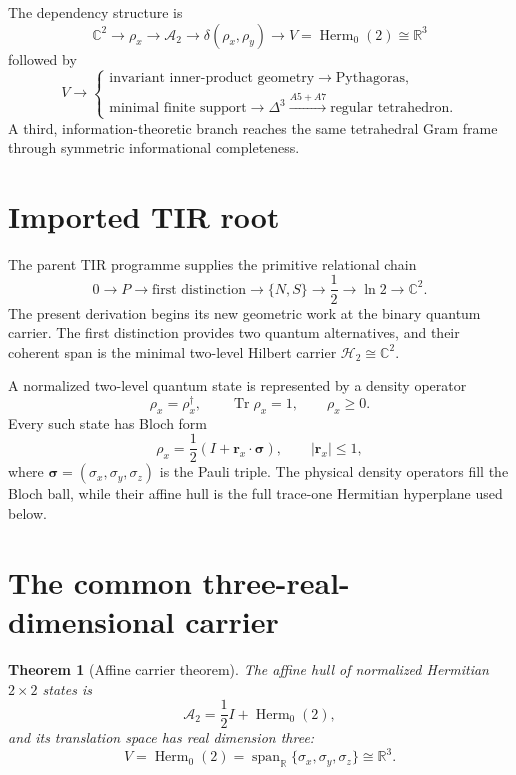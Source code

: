 \documentclass[12pt,a4paper]{article}
\newtheorem{theorem}{Theorem}[section]
\newcommand{\Herm}{\operatorname{Herm}}
\newcommand{\Tr}{\operatorname{Tr}}
\newcommand{\R}{\mathbb{R}}
\newcommand{\C}{\mathbb{C}}
\newcommand{\Astate}{\mathcal{A}_2}
\newcommand{\sigmavec}{\bm{\sigma}}
\newcommand{\rvec}{\bm{r}}
\begin{document}
The dependency structure is
\[
\boxed{
\C^2
\longrightarrow
\rho_x
\longrightarrow
\Astate
\longrightarrow
\delta(\rho_x,\rho_y)
\longrightarrow
V=\Herm_0(2)\cong\R^3
}
\]
followed by
\[
\boxed{
V\longrightarrow
\begin{cases}
\text{invariant inner-product geometry}\longrightarrow\text{Pythagoras},\\[2mm]
\text{minimal finite support}\longrightarrow\Delta^3\xrightarrow{A5+A7}\text{regular tetrahedron}.
\end{cases}}
\]
A third, information-theoretic branch reaches the same tetrahedral Gram frame through symmetric informational completeness.

\section{Imported TIR root}

The parent TIR programme supplies the primitive relational chain
\[
0\longrightarrow P\longrightarrow\text{first distinction}\longrightarrow\{N,S\}
\longrightarrow\frac12\longrightarrow\ln 2\longrightarrow\C^2.
\]
The present derivation begins its new geometric work at the binary quantum carrier. The first distinction provides two quantum alternatives, and their coherent span is the minimal two-level Hilbert carrier $\mathcal H_2\cong\C^2$.

A normalized two-level quantum state is represented by a density operator
\[
\rho_x=\rho_x^\dagger,\qquad \Tr\rho_x=1,\qquad \rho_x\ge 0.
\]
Every such state has Bloch form \cite{NielsenChuang}
\[
\boxed{
\rho_x=\frac12\left(I+\rvec_x\cdot\sigmavec\right),\qquad |\rvec_x|\le 1,
}
\]
where $\sigmavec=(\sigma_x,\sigma_y,\sigma_z)$ is the Pauli triple. The physical density operators fill the Bloch ball, while their affine hull is the full trace-one Hermitian hyperplane used below.

\section{The common three-real-dimensional carrier}

\begin{theorem}[Affine carrier theorem]\label{thm:carrier}
The affine hull of normalized Hermitian $2\times2$ states is
\[
\Astate=\frac12 I+\Herm_0(2),
\]
and its translation space has real dimension three:
\[
V=\Herm_0(2)=\operatorname{span}_{\R}\{\sigma_x,\sigma_y,\sigma_z\}\cong\R^3.
\]
\end{theorem}
\end{document}
